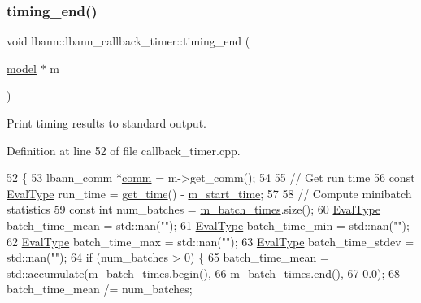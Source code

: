 \subsubsection{\texorpdfstring{timing\+\_\+end()}{timing\_end()}}
{\footnotesize\ttfamily void lbann\+::lbann\+\_\+callback\+\_\+timer\+::timing\+\_\+end (\begin{DoxyParamCaption}\item[{\hyperlink{classlbann_1_1model}{model} $\ast$}]{m }\end{DoxyParamCaption})\hspace{0.3cm}{\ttfamily [private]}}

Print timing results to standard output. 

Definition at line 52 of file callback\+\_\+timer.\+cpp.


\begin{DoxyCode}
52                                               \{
53   lbann\_comm *\hyperlink{file__io_8cpp_ab048c6f9fcbcfaa57ce68b00263dbebe}{comm} = m->get\_comm();
54 
55   \textcolor{comment}{// Get run time}
56   \textcolor{keyword}{const} \hyperlink{base_8hpp_a3266f5ac18504bbadea983c109566867}{EvalType} run\_time = \hyperlink{namespacelbann_a478d36031ff0659893c4322cd856157f}{get\_time}() - \hyperlink{classlbann_1_1lbann__callback__timer_a5e65e92eadce733120772d420ffbb7d5}{m\_start\_time};
57 
58   \textcolor{comment}{// Compute minibatch statistics}
59   \textcolor{keyword}{const} \textcolor{keywordtype}{int} num\_batches = \hyperlink{classlbann_1_1lbann__callback__timer_ae20dcc6bf921444e2724478ba751ade1}{m\_batch\_times}.size();
60   \hyperlink{base_8hpp_a3266f5ac18504bbadea983c109566867}{EvalType} batch\_time\_mean = std::nan(\textcolor{stringliteral}{""});
61   \hyperlink{base_8hpp_a3266f5ac18504bbadea983c109566867}{EvalType} batch\_time\_min = std::nan(\textcolor{stringliteral}{""});
62   \hyperlink{base_8hpp_a3266f5ac18504bbadea983c109566867}{EvalType} batch\_time\_max = std::nan(\textcolor{stringliteral}{""});
63   \hyperlink{base_8hpp_a3266f5ac18504bbadea983c109566867}{EvalType} batch\_time\_stdev = std::nan(\textcolor{stringliteral}{""});
64   \textcolor{keywordflow}{if} (num\_batches > 0) \{
65     batch\_time\_mean = std::accumulate(\hyperlink{classlbann_1_1lbann__callback__timer_ae20dcc6bf921444e2724478ba751ade1}{m\_batch\_times}.begin(),
66                                       \hyperlink{classlbann_1_1lbann__callback__timer_ae20dcc6bf921444e2724478ba751ade1}{m\_batch\_times}.end(),
67                                       0.0);
68     batch\_time\_mean /= num\_batches;

\end{DoxyCode}
